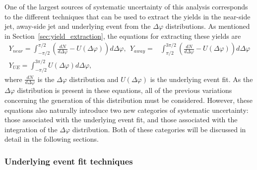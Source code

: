 One of the largest sources of systematic uncertainty of this analysis corresponds to the different techniques that can be used to extract the yields in the near-side jet, away-side jet and underlying event from the $\Delta\varphi$ distributions. As mentioned in Section~\ref{sec:yield_extraction}, the equations for extracting these yields are
%
\begin{eqnarray}
    Y_{near} = \int_{-\pi/2}^{\pi/2} (\frac{dN}{d\Delta\varphi}- U(\Delta\varphi))d\Delta\varphi,  \  \ Y_{away} = & \int_{\pi/2}^{3\pi/2} (\frac{dN}{d\Delta\varphi}- U(\Delta\varphi))d\Delta\varphi 
    \label{eq:jet_yields}
    \\ 
    Y_{UE} = \int_{-\pi/2}^{3\pi/2} U(\Delta\varphi)d\Delta\varphi,
    \label{eq:ue_yield}
\end{eqnarray}
%
where $\frac{dN}{d\Delta\varphi}$ is the $\Delta\varphi$ distribution and $U(\Delta\varphi)$ is the underlying event fit. As the $\Delta\varphi$ distribution is present in these equations, all of the previous variations concerning the generation of this distribution must be considered. However, these equations also naturally introduce two new categories of systematic uncertainty: those associated with the underlying event fit, and those associated with the integration of the $\Delta\varphi$ distribution. Both of these categories will be discussed in detail in the following sections.


\subsubsection{Underlying event fit techniques}
\label{sec:ue_fit_systematics}


